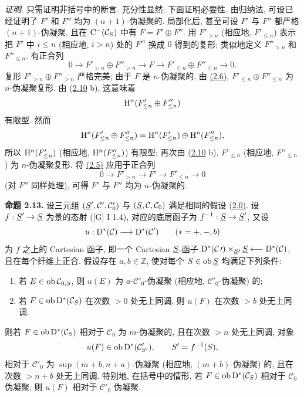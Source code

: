 \emph{证明.} 只需证明非括号中的断言. 充分性显然; 下面证明必要性. 由归纳法, 可设已经证明了 \(F'\) 和 \(F''\) 均为 \((n+1)\)-伪凝聚的. 局部化后, 甚至可设 \(F'\) 与 \(F''\) 都严格 \((n+1)\)-伪凝聚, 且在 \(\mathrm C^-(\mathcal C_S)\) 中有 \(F=F'\oplus F''\). 用 \(F'_{>n}\) (相应地, \(F'_{\leq n}\)) 表示把 \(F'\) 中 \(i\leq n\) (相应地, \(i>n\)) 处的 \(F'^i\) 换成 \(0\) 得到的复形; 类似地定义 \(F''_{>n}\) 和 \(F''_{\leq n}\). 有正合列
\[
  0\longrightarrow F'_{>n}\oplus F''_{>n}\longrightarrow F
  \longrightarrow F'_{\leq n}\oplus F''_{\leq n}\longrightarrow 0 .
\]
复形 \(F'_{>n}\oplus F''_{>n}\) 严格完美; 由于 \(F\) 是 \(n\)-伪凝聚的, 由 \hyperlink{sga6.e01.schol.2-6}{(2.6)}, \(F'_{\leq n}\oplus F''_{\leq n}\) 为 \(n\)-伪凝聚复形. 由 (\hyperlink{sga6.e01.prop.2-10}{2.10} b), 这意味着
\[
  \mathrm H^n(F'_{\leq n}\oplus F''_{\leq n})
\]
有限型. 然而
\[
  \mathrm H^n(F'_{\leq n}\oplus F''_{\leq n})
  =\mathrm H^n(F'_{\leq n})\oplus \mathrm H^n(F''_{\leq n}),
\]
所以 \(\mathrm H^n(F'_{\leq n})\) (相应地, \(\mathrm H^n(F''_{\leq n})\)) 有限型; 再次由 (\hyperlink{sga6.e01.prop.2-10}{2.10} b), \(F'_{\leq n}\) (相应地, \(F''_{\leq n}\)) 为 \(n\)-伪凝聚复形. 将 \hyperlink{sga6.e01.prop.2-5}{(2.5)} 应用于正合列
\[
  0\longrightarrow F'_{>n}\longrightarrow F'\longrightarrow F'_{\leq n}\longrightarrow 0
\]
(对 \(F''\) 同样处理), 可得 \(F'\) 与 \(F''\) 均为 \(n\)-伪凝聚的.

\textbf{命题 2.13.} 设三元组 \((\underline S',\mathcal C',\mathcal C'_0)\) 与 \((\underline S,\mathcal C,\mathcal C_0)\) 满足相同的假设 \hyperlink{sga6.e01.para.2-0}{(2.0)}. 设 \(f:\underline S'\to\underline S\) 为景的态射 ([G] I 1.4), 对应的底层函子为 \(f^{-1}:\underline S\to\underline S'\), 又设
\[
  u:\mathrm D^*(\mathcal C)\longrightarrow \mathrm D^*(\mathcal C')\qquad (*=+,-,b)
\]
为 \(f\) 之上的 Cartesian 函子, 即一个 Cartesian \(\underline S\)-函子 \(\mathrm D^*(\mathcal C\prime)\times_{\underline S\prime}\underline S\longleftarrow\mathrm D^*(\mathcal C)\), 且在每个纤维上正合. 假设存在 \(a,b\in\mathbb Z\), 使对每个 \(S\in\operatorname{ob}\underline S\) 均满足下列条件:

\begin{enumerate}[label=(\roman*)]
\item 若 \(E\in\operatorname{ob}\mathcal C_{0,S}\), 则 \(u(E)\) 为 \(a\)-\(\mathcal C'_0\)-伪凝聚 (相应地, \(\mathcal C'_0\)-伪凝聚) 的;
\item 若 \(F\in\operatorname{ob}\mathrm D^*(\mathcal C_S)\) 在次数 \(>0\) 处无上同调, 则 \(u(F)\) 在次数 \(>b\) 处无上同调.
\end{enumerate}

则若 \(F\in\operatorname{ob}\mathrm D^*(\mathcal C_S)\) 相对于 \(\mathcal C_0\) 为 \(m\)-伪凝聚的, 且在次数 \(>n\) 处无上同调, 对象
\[
  u(F)\in\operatorname{ob}\mathrm D^*(\mathcal C'_{S'}),\qquad S'=f^{-1}(S),
\]
相对于 \(\mathcal C'_0\) 为 \(\sup(m+b,n+a)\)-伪凝聚 (相应地, \((m+b)\)-伪凝聚) 的, 且在次数 \(>n+b\) 处无上同调. 特别地, 在括号中的情形, 若 \(F\in\operatorname{ob}\mathrm D^*(\mathcal C_S)\) 相对于 \(\mathcal C_0\) 伪凝聚, 则 \(u(F)\) 相对于 \(\mathcal C'_0\) 伪凝聚.

